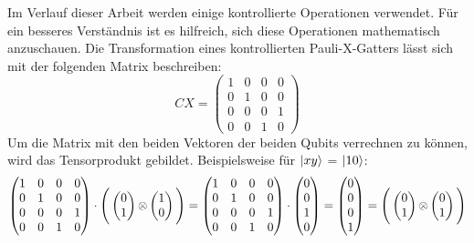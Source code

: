 Im Verlauf dieser Arbeit werden einige kontrollierte Operationen verwendet. 
Für ein besseres Verständnis ist es hilfreich, 
sich diese Operationen mathematisch anzuschauen.
Die Transformation eines kontrollierten Pauli-X-Gatters lässt sich mit der folgenden Matrix beschreiben:
\[
  CX = 
  \begin{pmatrix}
    1 & 0 & 0 & 0\\
    0 & 1 & 0 & 0\\
    0 & 0 & 0 & 1\\
    0 & 0 & 1 & 0
    \end{pmatrix}
  \]
Um die Matrix mit den beiden Vektoren der beiden Qubits verrechnen zu können, 
wird das Tensorprodukt gebildet. Beispielsweise für \(\ket{xy}\) = \(\ket{10}\):
\[
  \begin{pmatrix}
    1 & 0 & 0 & 0\\
    0 & 1 & 0 & 0\\
    0 & 0 & 0 & 1\\
    0 & 0 & 1 & 0
    \end{pmatrix}
    \cdot
    \Bigg(
  \begin{pmatrix}
    0 \\
    1
  \end{pmatrix} \operatorname{\otimes}
  \begin{pmatrix}
    1 \\
    0
  \end{pmatrix}
  \Bigg)
  =
  \begin{pmatrix}
    1 & 0 & 0 & 0\\
    0 & 1 & 0 & 0\\
    0 & 0 & 0 & 1\\
    0 & 0 & 1 & 0
    \end{pmatrix}
    \cdot
  \begin{pmatrix}
    0 \\
    0 \\
    1 \\
    0
  \end{pmatrix}
  =
  \begin{pmatrix}
    0 \\
    0 \\
    0 \\
    1
  \end{pmatrix}
  =
  \Bigg(
    \begin{pmatrix}
      0 \\
      1
    \end{pmatrix} \operatorname{\otimes}
    \begin{pmatrix}
      0 \\
      1
    \end{pmatrix}
    \Bigg)
\]

